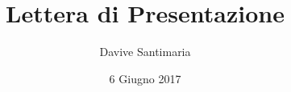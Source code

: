 



\title{\textbf{Lettera di Presentazione}}
\author{Davive Santimaria}

\date{6 Giugno 2017}






